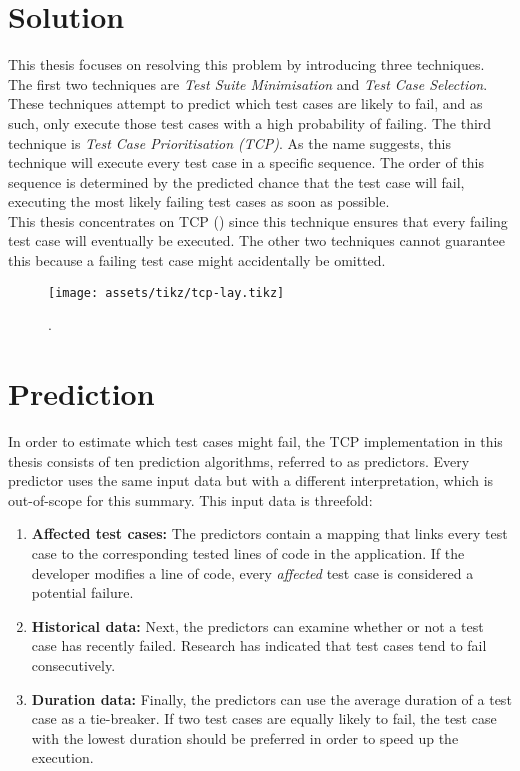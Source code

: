 \section*{Solution}
This thesis focuses on resolving this problem by introducing three techniques. The first two techniques are \emph{Test Suite Minimisation} and \emph{Test Case Selection}. These techniques attempt to predict which test cases are likely to fail, and as such, only execute those test cases with a high probability of failing. The third technique is \emph{Test Case Prioritisation (TCP)}. As the name suggests, this technique will execute every test case in a specific sequence. The order of this sequence is determined by the predicted chance that the test case will fail, executing the most likely failing test cases as soon as possible.\\ This thesis concentrates on TCP () since this technique ensures that every failing test case will eventually be executed. The other two techniques cannot guarantee this because a failing test case might accidentally be omitted. 

\begin{figure}[t!]
	\centering
	\texttt{[image: assets/tikz/tcp-lay.tikz]}
	\caption{\tcp{}.}
	\label{fig:tcp-lay}
\end{figure}

\section*{Prediction}
In order to estimate which test cases might fail, the TCP implementation in this thesis consists of ten prediction algorithms, referred to as predictors. Every predictor uses the same input data but with a different interpretation, which is out-of-scope for this summary. This input data is threefold:
\begin{enumerate}
	\item \textbf{Affected test cases:} The predictors contain a mapping that links every test case to the corresponding tested lines of code in the application. If the developer modifies a line of code, every \emph{affected} test case is considered a potential failure.
	
	\item \textbf{Historical data:} Next, the predictors can examine whether or not a test case has recently failed. Research has indicated that test cases tend to fail consecutively.
	
	\item \textbf{Duration data:} Finally, the predictors can use the average duration of a test case as a tie-breaker. If two test cases are equally likely to fail, the test case with the lowest duration should be preferred in order to speed up the execution.
\end{enumerate}

